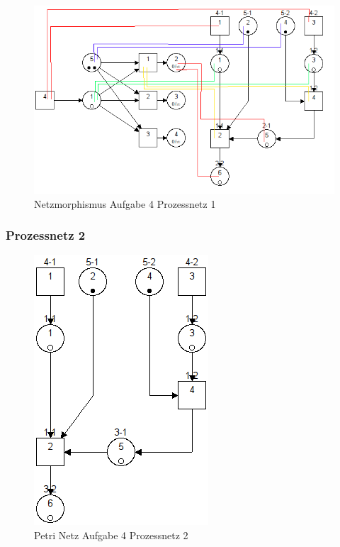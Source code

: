 \documentclass[10pt]{scrartcl}
\begin{document}
			\begin{figure}[H]
    			\centering
				\includegraphics[scale=0.5]{transf1.png}		
            	\caption{Netzmorphismus Aufgabe 4 Prozessnetz 1}
            	\label{petri:aufg4:pro1:morph}
			\end{figure}				
				
		\subsubsection{Prozessnetz 2}
			\begin{figure}[H]
    			\centering
				\includegraphics[scale=0.75]{aufg4Proc2.png}		
            	\caption{Petri Netz Aufgabe 4 Prozessnetz 2}
            	\label{petri:aufg4:pro2}
			\end{figure}	
			
\end{document}
